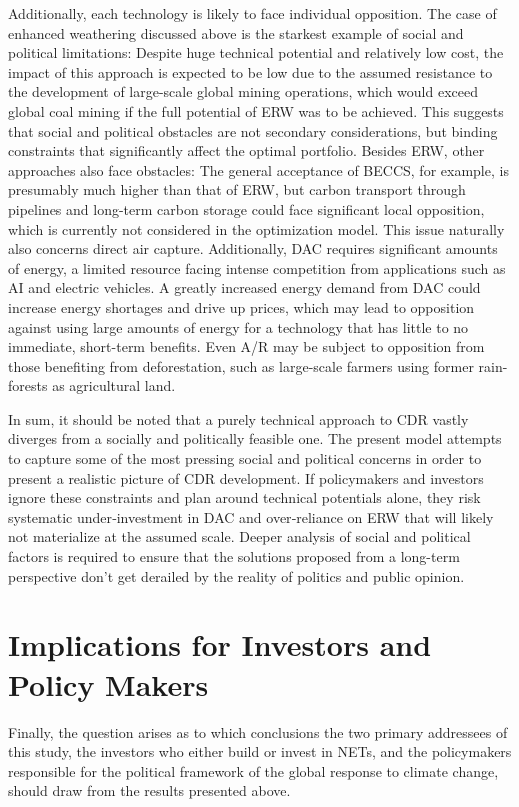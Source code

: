 Additionally, each technology is likely to face individual opposition. The case of enhanced weathering discussed above is the starkest example of social and political limitations: Despite huge technical potential and relatively low cost, the impact of this approach is expected to be low due to the assumed resistance to the development of large-scale global mining operations, which would exceed global coal mining if the full potential of ERW was to be achieved. This suggests that social and political obstacles are not secondary considerations, but binding constraints that significantly affect the optimal portfolio. Besides ERW, other approaches also face obstacles: The general acceptance of BECCS, for example, is presumably much higher than that of ERW, but carbon transport through pipelines and long-term carbon storage could face significant local opposition, which is currently not considered in the optimization model. This issue naturally also concerns direct air capture. Additionally, DAC requires significant amounts of energy, a limited resource facing intense competition from applications such as AI and electric vehicles. A greatly increased energy demand from DAC could increase energy shortages and drive up prices, which may lead to opposition against using large amounts of energy for a technology that has little to no immediate, short-term benefits. Even A/R may be subject to opposition from those benefiting from deforestation, such as large-scale farmers using former rain-forests as agricultural land.\vspace{2mm}

In sum, it should be noted that a purely technical approach to CDR vastly diverges from a socially and politically feasible one. The present model attempts to capture some of the most pressing social and political concerns in order to present a realistic picture of CDR development. If policymakers and investors ignore these constraints and plan around technical potentials alone, they risk systematic under‑investment in DAC and over‑reliance on ERW that will likely not materialize at the assumed scale. Deeper analysis of social and political factors is required to ensure that the solutions proposed from a long-term perspective don't get derailed by the reality of politics and public opinion.

\section{Implications for Investors and Policy Makers}
Finally, the question arises as to which conclusions the two primary addressees of this study, the investors who either build or invest in NETs, and the policymakers responsible for the political framework of the global response to climate change, should draw from the results presented above.\vspace{2mm}

